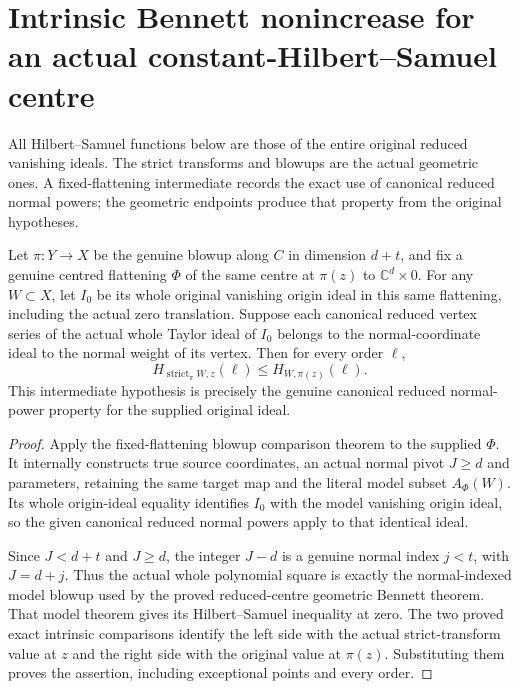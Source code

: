 \section{Intrinsic Bennett nonincrease for an actual constant-Hilbert--Samuel centre}
\label{sec:hironaka-actual-hs-constant-centre-bennett}

All Hilbert--Samuel functions below are those of the entire original
reduced vanishing ideals. The strict transforms and blowups are the
actual geometric ones. A fixed-flattening intermediate records the
exact use of canonical reduced normal powers; the geometric endpoints
produce that property from the original hypotheses.

\begin{theorem}
\label{hir:actual-fixed-chart-reduced-centre-geometric-bennett}
\leanok
Let $\pi:Y\to X$ be the genuine blowup along $C$ in dimension
$d+t$, and fix a genuine centred flattening $\Phi$ of the same
centre at $\pi(z)$ to $\mathbb C^d\times0$. For any $W\subset X$,
let $I_0$ be its whole original vanishing origin ideal in this
same flattening, including the actual zero translation.
Suppose each canonical reduced vertex series of the actual
whole Taylor ideal of $I_0$ belongs to the normal-coordinate
ideal to the normal weight of its vertex. Then for every
order $\ell$,
\[
 H_{\operatorname{strict}_\pi W,z}(\ell)
 \le H_{W,\pi(z)}(\ell).
\]
This intermediate hypothesis is precisely the genuine canonical
reduced normal-power property for the supplied original ideal.
\end{theorem}
\begin{proof}
Apply the fixed-flattening blowup comparison theorem to the
supplied $\Phi$. It internally constructs true source coordinates,
an actual normal pivot $J\ge d$ and parameters, retaining the same
target map and the literal model subset $A_\Phi(W)$. Its whole
origin-ideal equality identifies $I_0$ with the model vanishing
origin ideal, so the given canonical reduced normal powers
apply to that identical ideal.

Since $J<d+t$ and $J\ge d$, the integer $J-d$ is a genuine
normal index $j<t$, with $J=d+j$. Thus the actual whole polynomial
square is exactly the normal-indexed model blowup used by the
proved reduced-centre geometric Bennett theorem. That model
theorem gives its Hilbert--Samuel inequality at zero. The two
proved exact intrinsic comparisons identify the left side with
the actual strict-transform value at $z$ and the right side
with the original value at $\pi(z)$. Substituting them proves
the assertion, including exceptional points and every order.
\end{proof}

